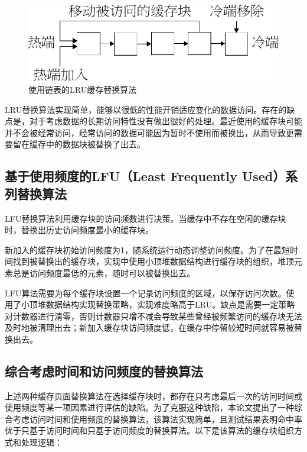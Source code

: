 \begin{figure}[H]
\centering
\includegraphics[width=0.6\linewidth]{./graph/replace-algo-lru}
\caption{使用链表的LRU缓存替换算法}
\label{fig:replace-algo-lru}
\end{figure}

LRU替换算法实现简单，能够以很低的性能开销适应变化的数据访问。存在的缺点是，对于考虑数据的长期访问特性没有做出很好的处理。最近使用的缓存块可能并不会被经常访问，经常访问的数据可能因为暂时不使用而被换出，从而导致更需要留在缓存中的数据块被替换了出去。

\subsection{基于使用频度的LFU（Least Frequently Used）系列替换算法}

LFU替换算法\cite{LFU}利用缓存块的访问频数进行决策。当缓存中不存在空闲的缓存块时，替换出历史访问频度最小的缓存块。

新加入的缓存块初始访问频度为1，随系统运行动态调整访问频度。为了在最短时间找到被替换出的缓存块，实现中使用小顶堆数据结构进行缓存块的组织，堆顶元素总是访问频度最低的元素，随时可以被替换出去。

LFU算法需要为每个缓存块设置一个记录访问频度的区域，以保存访问次数。使用了小顶堆数据结构实现替换策略，实现难度略高于LRU。缺点是需要一定策略对计数器进行清零，否则计数器只增不减会导致某些曾经被频繁访问的缓存块无法及时地被清理出去；新加入缓存块访问频度低，在缓存中停留较短时间就容易被替换出去。

\subsection{综合考虑时间和访问频度的替换算法}

上述两种缓存页面替换算法在选择缓存块时，都存在只考虑最后一次的访问时间或使用频度等某一项因素进行评估的缺陷。为了克服这种缺陷，本论文提出了一种综合考虑访问时间和使用频度的替换算法，该算法实现简单，且测试结果表明命中率优于只基于访问时间和只基于访问频度的替换算法。以下是该算法的缓存块组织方式和处理逻辑：

